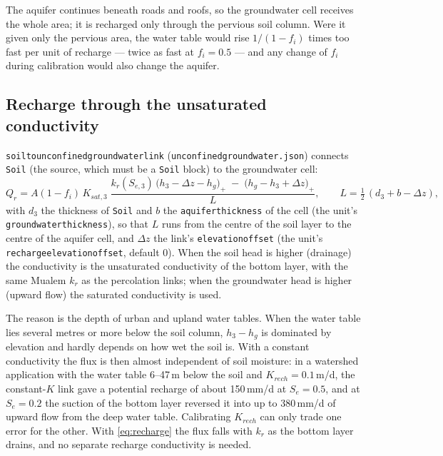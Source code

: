 \documentclass[11pt,a4paper]{article}
\newcommand{\code}[1]{\texttt{\small #1}}
\newcommand{\file}[1]{\texttt{\small #1}}
\renewcommand{\_}{\oldus\allowbreak}   %
\begin{document}
\noindent The aquifer continues beneath roads and roofs, so the groundwater cell receives the whole
area; it is recharged only through the pervious soil column. Were it given only the pervious area, the
water table would rise $1/(1-f_i)$ times too fast per unit of recharge --- twice as fast at
$f_i=0.5$ --- and any change of $f_i$ during calibration would also change the aquifer.

\subsection{Recharge through the unsaturated conductivity}
\label{sec:recharge}
\code{soil\_to\_unconfined\_groundwater\_link} (\file{unconfined\_groundwater.json}) connects
\code{Soil\_3} (the source, which must be a \code{Soil} block) to the groundwater cell:
\begin{equation}
  Q_r = A(1-f_i)\,K_{sat,3}\;
        \frac{k_r(S_{e,3})\,\big(h_3-\Delta z-h_g\big)_+ \;-\; \big(h_g-h_3+\Delta z\big)_+}{L},
        \qquad L=\tfrac12\,(d_3+b-\Delta z),
  \label{eq:recharge}
\end{equation}
with $d_3$ the thickness of \code{Soil\_3} and $b$ the \code{aquifer\_thickness} of the cell (the
unit's \code{groundwater\_thickness}), so that $L$ runs from the centre of the soil layer to the centre
of the aquifer cell, and $\Delta z$ the link's \code{elevation\_offset} (the unit's
\code{recharge\_elevation\_offset}, default 0). When the soil head is higher (drainage) the conductivity is the unsaturated conductivity of the bottom
layer, with the same Mualem $k_r$ as the percolation links; when the groundwater head is higher
(upward flow) the saturated conductivity is used.

The reason is the depth of urban and upland water tables. When the water table lies several metres or
more below the soil column, $h_3-h_g$ is dominated by elevation and hardly depends on how wet the soil
is. With a constant conductivity the flux is then almost independent of soil moisture: in a
watershed application with the water table 6--47\,m below the soil and $K_{rech}=0.1$\,m/d, the
constant-$K$ link gave a potential recharge of about 150\,mm/d at $S_e=0.5$, and at $S_e=0.2$ the
suction of the bottom layer reversed it into up to 380\,mm/d of upward flow from the deep water
table. Calibrating $K_{rech}$ can only trade one error for the other. With \eqref{eq:recharge} the
flux falls with $k_r$ as the bottom layer drains, and no separate recharge conductivity is needed.
\end{document}
